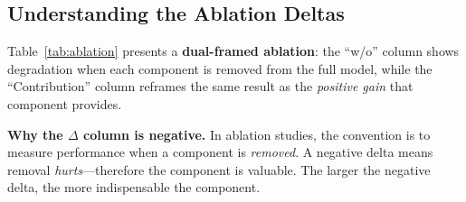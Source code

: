 \documentclass[10pt,twocolumn]{article}
\begin{document}
\subsection{Understanding the Ablation Deltas}

Table~\ref{tab:ablation} presents a \textbf{dual-framed ablation}: the ``w/o'' column shows degradation when each component is removed from the full model, while the ``Contribution'' column reframes the same result as the \emph{positive gain} that component provides.

\begin{table}[t]
\centering
\caption{Ablation study (avg.\ classification AUC-ROC across 3 datasets). The negative $\Delta$ shows degradation upon removal; the Contribution column reframes this as the positive gain each component provides to the full model.}
\label{tab:ablation}
\end{table}

\textbf{Why the $\Delta$ column is negative.} In ablation studies, the convention is to measure performance when a component is \emph{removed}. A negative delta means removal \emph{hurts}---therefore the component is valuable. The larger the negative delta, the more indispensable the component.
\end{document}
